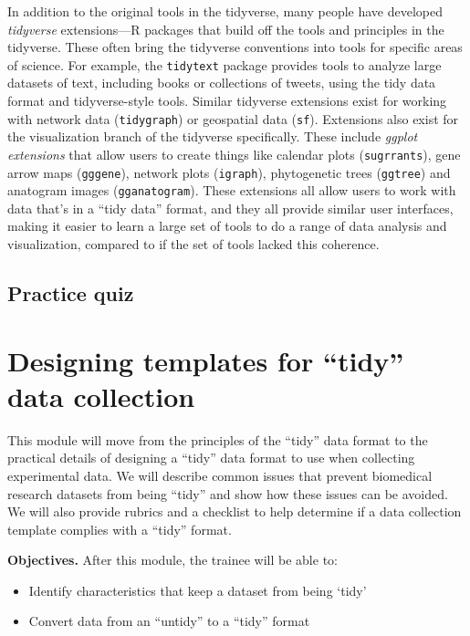 \documentclass[]{tufte-book}
\providecommand{\tightlist}{%
  \setlength{\itemsep}{0pt}\setlength{\parskip}{0pt}}
\begin{document}
In addition to the original tools in the tidyverse, many people have developed
\emph{tidyverse} extensions---R packages that build off the tools and principles in
the tidyverse. These often bring the tidyverse conventions into tools for
specific areas of science. For example, the \texttt{tidytext} package provides tools to
analyze large datasets of text, including books or collections of tweets, using
the tidy data format and tidyverse-style tools. Similar tidyverse extensions
exist for working with network data (\texttt{tidygraph}) or geospatial data (\texttt{sf}).
Extensions also exist for the visualization branch of the tidyverse
specifically. These include \emph{ggplot extensions} that allow users to create
things like calendar plots (\texttt{sugrrants}), gene arrow maps (\texttt{gggene}), network
plots (\texttt{igraph}), phytogenetic trees (\texttt{ggtree}) and anatogram images
(\texttt{gganatogram}). These extensions all allow users to work with data that's in a
``tidy data'' format, and they all provide similar user interfaces, making it
easier to learn a large set of tools to do a range of data analysis and
visualization, compared to if the set of tools lacked this coherence.

\hypertarget{practice-quiz}{%
\subsection{Practice quiz}\label{practice-quiz}}

\hypertarget{module4}{%
\section{Designing templates for ``tidy'' data collection}\label{module4}}

This module will move from the principles of the ``tidy'' data format to the
practical details of designing a ``tidy'' data format to use when collecting
experimental data. We will describe common issues that prevent biomedical
research datasets from being ``tidy'' and show how these issues can be avoided. We
will also provide rubrics and a checklist to help determine if a data collection
template complies with a ``tidy'' format.

\textbf{Objectives.} After this module, the trainee will be able to:

\begin{itemize}
\tightlist
\item
  Identify characteristics that keep a dataset from being `tidy'
\item
  Convert data from an ``untidy'' to a ``tidy'' format
\end{itemize}
\end{document}
